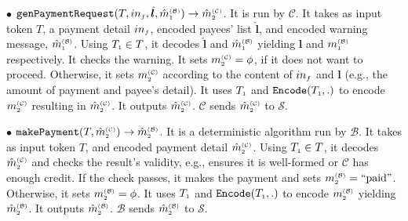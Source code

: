 \begin{definition}
\item  [$\bullet$] $\mathtt{genPaymentRequest}(T, in_{\scriptscriptstyle f}, \hat{\bm{l}}, \hat m^{\scriptscriptstyle\mathcal{(B)}}_{\scriptscriptstyle1})\rightarrow \hat m^{\scriptscriptstyle\mathcal{(C)}}_{\scriptscriptstyle2}$. It is  run by $\mathcal{C}$. It takes as input token $T$, a payment detail $in_{\scriptscriptstyle f}$, encoded payees' list $\hat{\bm{l}}$, and encoded warning message,  $\hat m^{\scriptscriptstyle\mathcal{(B)}}_{\scriptscriptstyle1}$. Using $T_{\scriptscriptstyle 1}\in T$, it decodes  $\hat{\bm{l}}$ and $\hat m^{\scriptscriptstyle\mathcal{(B)}}_{\scriptscriptstyle1}$ yielding ${\bm{l}}$ and $m^{\scriptscriptstyle\mathcal{(B)}}_{\scriptscriptstyle1}$ respectively. It checks the warning.  It sets   $m^{\scriptscriptstyle\mathcal{(C)}}_{\scriptscriptstyle2}=\phi$, if it does not want to proceed. Otherwise, it  sets $m^{\scriptscriptstyle\mathcal{(C)}}_{\scriptscriptstyle2}$ according to the content of $in_{\scriptscriptstyle f}$ and  ${\bm{l}}$ (e.g., the amount of payment and payee's detail). It uses $T_{\scriptscriptstyle 1}$ and  $\mathtt{Encode}(T_{\scriptscriptstyle 1}, .)$ to encode $m^{\scriptscriptstyle\mathcal{(C)}}_{\scriptscriptstyle2}$ resulting in $\hat m^{\scriptscriptstyle\mathcal{(C)}}_{\scriptscriptstyle2}$. It outputs $\hat m^{\scriptscriptstyle\mathcal{(C)}}_{\scriptscriptstyle2}$. $\mathcal{C}$ sends $\hat m^{\scriptscriptstyle\mathcal{(C)}}_{\scriptscriptstyle2}$ to $\mathcal{S}$. 
%

\item  [$\bullet$] $\mathtt{makePayment}(T, \hat m^{\scriptscriptstyle\mathcal{(C)}}_{\scriptscriptstyle2})\rightarrow \hat m^{\scriptscriptstyle\mathcal{(B)}}_{\scriptscriptstyle2}$. It is a deterministic algorithm run by $\mathcal{B}$. It takes as input token $T$,  and encoded payment  detail $\hat m^{\scriptscriptstyle\mathcal{(C)}}_{\scriptscriptstyle2}$. Using $T_{\scriptscriptstyle 1}\in T$, it decodes $\hat m^{\scriptscriptstyle\mathcal{(C)}}_{\scriptscriptstyle2}$ and  checks the result's validity, e.g., ensures it is well-formed or $\mathcal{C}$ has enough credit. If the check  passes,  it makes the payment and  sets $m^{\scriptscriptstyle\mathcal{(B)}}_{\scriptscriptstyle2}=\text{``paid''}$. Otherwise, it sets $m^{\scriptscriptstyle\mathcal{(B)}}_{\scriptscriptstyle2}=\phi$. It uses $T_{\scriptscriptstyle 1}$ and  $\mathtt{Encode}(T_{\scriptscriptstyle 1}, .)$ to encode $m^{\scriptscriptstyle\mathcal{(B)}}_{\scriptscriptstyle2}$ yielding $\hat m^{\scriptscriptstyle\mathcal{(B)}}_{\scriptscriptstyle2}$. It outputs $\hat m^{\scriptscriptstyle\mathcal{(B)}}_{\scriptscriptstyle2}$. $\mathcal{B}$ sends $\hat m^{\scriptscriptstyle\mathcal{(B)}}_{\scriptscriptstyle2}$ to $\mathcal{S}$.
%


\end{definition}
